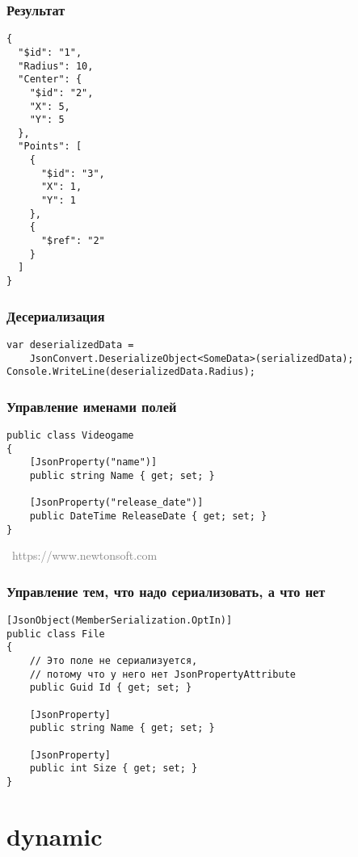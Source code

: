 \documentclass[xetex,mathserif,serif]{beamer}
\newcommand{\attribution}[1] {
\vspace{-5mm}\begin{flushright}\begin{scriptsize}\textcolor{gray}{\textcopyright\, #1}\end{scriptsize}\end{flushright}
}
\begin{document}
    \begin{frame}[fragile]
        \frametitle{Результат}
        \begin{footnotesize}
            \begin{verbatim}
{
  "$id": "1",
  "Radius": 10,
  "Center": {
    "$id": "2",
    "X": 5,
    "Y": 5
  },
  "Points": [
    {
      "$id": "3",
      "X": 1,
      "Y": 1
    },
    {
      "$ref": "2"
    }
  ]
}
            \end{verbatim}
        \end{footnotesize}
    \end{frame}

    \begin{frame}[fragile]
        \frametitle{Десериализация}
        \begin{verbatim}
var deserializedData = 
    JsonConvert.DeserializeObject<SomeData>(serializedData);
Console.WriteLine(deserializedData.Radius);
        \end{verbatim}
    \end{frame}

    \begin{frame}[fragile]
        \frametitle{Управление именами полей}
        \begin{verbatim}
public class Videogame
{
    [JsonProperty("name")]
    public string Name { get; set; }

    [JsonProperty("release_date")]
    public DateTime ReleaseDate { get; set; }
}
        \end{verbatim}
        \attribution{https://www.newtonsoft.com}
    \end{frame}

    \begin{frame}[fragile]
        \frametitle{Управление тем, что надо сериализовать, а что нет}
        \begin{verbatim}
[JsonObject(MemberSerialization.OptIn)]
public class File
{
    // Это поле не сериализуется,
    // потому что у него нет JsonPropertyAttribute
    public Guid Id { get; set; }

    [JsonProperty]
    public string Name { get; set; }

    [JsonProperty]
    public int Size { get; set; }
}
        \end{verbatim}
    \end{frame}

    \section{dynamic}
\end{document}

